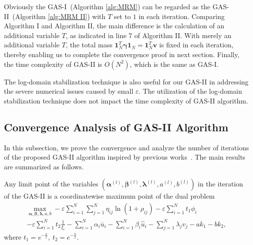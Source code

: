 \documentclass[review,hidelinks,onefignum,onetabnum]{siamart220329}
\begin{document}
Obviously the GAS-I~(Algorithm \ref{alg:MRM}) can be regarded as the GAS-II~(Algorithm \ref{alg:MRM II}) with $T$ set to $1$ in each iteration.
Comparing Algorithm I and Algorithm II, the main difference is the calculation of an additional variable $T$, as indicated in line 7 of Algorithm II.
With merely an additional variable $T$,  the total mass $\bm{1}_N^T\bm{\gamma}\bm{1}_N=\bm{1}_N^T\bm{v}$ is fixed in each iteration, thereby enabling us to complete the convergence proof in next section.
Finally, the time complexity of GAS-II is $O(N^2)$, which is the same as GAS-I.




\begin{remark}
The log-domain stabilization technique \cite{chizat2018scaling} is also useful for our GAS-II
in addressing the severe numerical issues caused by small $\varepsilon$. 
The utilization of the log-domain stabilization technique does not impact the time complexity of GAS-II algorithm. 
\end{remark}



\subsection{Convergence Analysis of GAS-II Algorithm}\label{subsec:convergence}
In this subsection, we prove the convergence and analyze the number of iterations of the proposed GAS-II algorithm inspired by previous works~\cite{wu2022double,villani2009optimal,peyre2019computational}. 
The main results are summarized as follows.

\begin{theorem}\label{thm:con}
Any limit point of the variables $\left(\bm{\alpha}^{(l)},\bm{\beta}^{(l)},\bm{\lambda}^{(l)},a^{(l)},b^{(l)}\right)$ in the iteration of the GAS-II is a coordinatewise maximum point of the dual problem
 \begin{multline}
\max_{\bm{\alpha},\bm{\beta},\bm{\lambda},a,b}  -\varepsilon \sum_{i=1}^{N}\sum_{j=1}^{N} \eta_{ij}\ln(1+\rho_{ij})-\varepsilon \sum_{i=1}^{N} t_1 \phi_{i}\\
  -\varepsilon \sum_{i=1}^{N} t_2 \frac{1}{\xi_{i}} - \sum_{i=1}^{N} \alpha_{i} \overline{u}_i- \sum_{i=1}^{N} \beta_{i} \hat{u}_i-\sum_{j=1}^{N}\lambda_jv_j -ak_1 -b k_2,
\end{multline}
where 
$t_1=e^{-\frac{a}{\varepsilon}}, \  t_2=e^{-\frac{b}{\varepsilon}}.$
\end{theorem}
\end{document}
